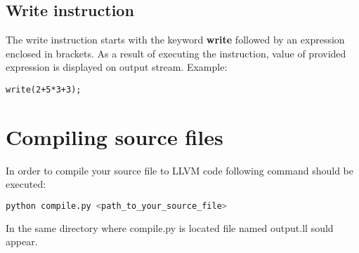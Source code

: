 \documentclass{ol-softwaremanual}
\begin{document}
\subsection{Write instruction}
The write instruction starts with the keyword \textbf{write} followed by an expression enclosed in brackets. As a result of executing the instruction, value of provided expression is displayed on output stream.
Example: 
\begin{alltt}
write(2 + 5 * 3 + 3);
\end{alltt}
\section{Compiling source files}
In order to compile your source file to LLVM code following command should be executed:
\begin{lstlisting}[language=bash]
  python compile.py <path_to_your_source_file>
\end{lstlisting}
In the same directory where compile.py is located file named output.ll sould appear.
\end{document}
